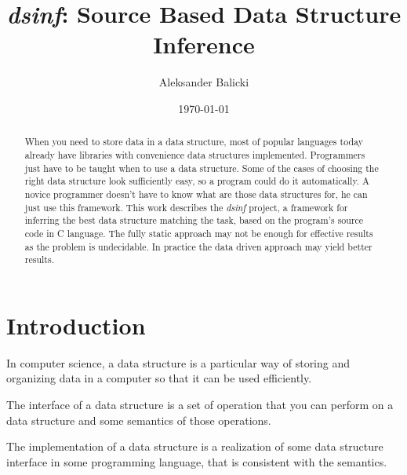 \documentclass[a4paper,11pt]{article}
\title{\emph{dsinf}: Source Based Data Structure Inference}
\author{Aleksander Balicki}
\date{\today}
\begin{document}
\vfill

\maketitle

\begin{abstract}

    When you need to store data in a data structure, most of popular languages
    today already have libraries with convenience data structures implemented.
    Programmers just have to be taught when to use a data structure. Some of
    the cases of choosing the right data structure look sufficiently easy, so a
    program could do it automatically. A novice programmer doesn't have to know
    what are those data structures for, he can just use this framework.  This
    work describes the \emph{dsinf} project, a framework for inferring the best
    data structure matching the task, based on the program's source code in C
    language. The fully static approach may not be enough for effective results
    as the problem is undecidable. In practice the data driven approach may
    yield better results.

\end{abstract}

\pagebreak

\tableofcontents

\vfill

\section{Introduction} \label{sec:intro}
	In computer science, a data structure is a particular way of storing and organizing data in a computer so that
	it can be used efficiently\cite{Wids}.

	The interface of a data structure is a set of operation that you can perform on a data structure and some
	semantics of those operations.

	The implementation of a data structure is a realization of some data structure interface in some programming
	language, that is consistent with the semantics.
\end{document}
